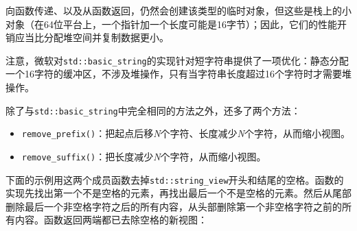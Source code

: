 
向函数传递、以及从函数返回，仍然会创建该类型的临时对象，但这些是栈上的小对象（在64位平台上，一个指针加一个长度可能是16字节）；因此，它们的性能开销应当比分配堆空间并复制数据更小。



\begin{myNote}
注意，微软对\texttt{std::\allowbreak{}basic\_\allowbreak{}string}的实现针对短字符串提供了一项优化：静态分配一个16字符的缓冲区，不涉及堆操作，只有当字符串长度超过16个字符时才需要堆操作。
\end{myNote}



除了与\texttt{std::\allowbreak{}basic\_\allowbreak{}string}中完全相同的方法之外，还多了两个方法：



\begin{itemize}
\item \texttt{remove\_\allowbreak{}prefix()}：把起点后移\textit{N}个字符、长度减少\textit{N}个字符，从而缩小视图。



\item \texttt{remove\_\allowbreak{}suffix()}：把长度减少\textit{N}个字符，从而缩小视图。

\end{itemize}



下面的示例用这两个成员函数去掉\texttt{std::\allowbreak{}string\_\allowbreak{}view}开头和结尾的空格。函数的实现先找出第一个不是空格的元素，再找出最后一个不是空格的元素。然后从尾部删除最后一个非空格字符之后的所有内容，从头部删除第一个非空格字符之前的所有内容。函数返回两端都已去除空格的新视图：



